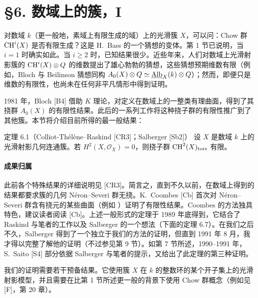 \section*{§6. 数域上的簇，I}
对数域 $k$（更一般地，素域上有限生成的域）上的光滑簇 $X$，可以问：Chow 群 $\operatorname{CH}^i(X)$ 是否有限生成？这是 H.~Bass 的一个猜想的变体。第 1 节已说明，当 $i=1$ 时确实如此。当 $i\ge2$ 时，已知结果很少。近些年来，人们对数域上光滑射影簇的 $\operatorname{CH}^i(X)\otimes Q$ 的维数提出了雄心勃勃的猜想，这些猜想预期维数有限（例如，Bloch 与 Beilinson 猜想同构 $A_0(X)\otimes Q\simeq\underline{\operatorname{Alb}}_X(k)\otimes Q$）；然而，即便只是维数的有限性，也尚未在任何非平凡情形中得到证明。

1981 年，Bloch [B4] 借助 $K$ 理论，对定义在数域上的一整类有理曲面，得到了其挠群 $A_0(X)$ 的有限性结果。此后的一系列工作将这种挠子群的有限性推广到了其他簇。本节将介绍目前所得的最一般结果：
\begin{statement}{定理 6.1（Colliot-Thélène--Raskind [CR3]；Salberger [Sb2]）}
设 $X$ 是数域 $k$ 上的光滑射影几何连通簇。若 $H^2(X,\mathcal O_X)=0$，则挠子群 $\operatorname{CH}^2(X)_{\mathrm{tors}}$ 有限。
\end{statement}
\paragraph{成果归属}
此前各个特殊结果的详细说明见 [CR3]。简言之，直到不久以前，在数域上得到的结果都要求簇的几何 Néron--Severi 群无挠。K.~Coombes [Cb] 首次对 Néron--Severi 群含有挠元的某些曲面（例如 ）证明了有限性结果。Coombes 的方法独具特色，建议读者阅读 [Cb]。上述一般形式的定理于 1989 年底得到，它结合了 Raskind 与笔者的工作以及 Salberger 的一个想法（下面的定理 6.7）。在我们之后不久，Salberger 得到了一个独立于我们的方法的证明，但直到 1991 年 8 月，我才得以完整了解他的证明（不过参见第 9 节）。如第 7 节所述，1990--1991 年，S.~Saito [S4] 部分依据 Salberger 与笔者的提示，又给出了此定理的第三种证明。

我们的证明需要若干预备结果。它使用簇 $X$ 在 $k$ 的整数环的某个开子集上的光滑射影模型，并且需要在比第 1 节所述更一般的背景下使用 Chow 群概念（例如见 [F]，第 20 章）。

